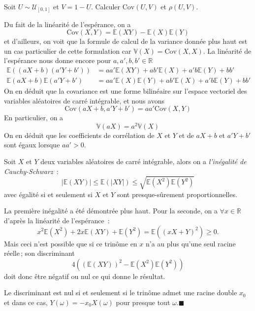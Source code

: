 \label{II-cov-unif}
Soit \(U \sim \mathcal{U}_{[0,1]}\) et \(V = 1-U\). Calculer
\(\text{Cov}(U,V)\) et \(\rho(U,V)\).

Du fait de la linéarité de l'espérance, on a
\[\text{Cov}(X,Y) = \mathbb{E}(XY) - \mathbb{E}(X)\mathbb{E}(Y)\] et
d'ailleurs, on voit que la formule de calcul de la variance donnée plus
haut est un cas particulier de cette formulation car
\(\mathbb{V}(X) = \text{Cov}(X,X)\). La linéarité de l'espérance nous
donne encore pour \(a,a',b,b' \in \mathbb{R}\) \begin{align*} 
\mathbb{E}((aX+b)(a'Y+b')) &= aa'\mathbb{E}(XY) + ab'\mathbb{E}(X) +a'b\mathbb{E}(Y) + bb'\\
\mathbb{E}(aX+b)\mathbb{E}(a'Y+b') &= aa'\mathbb{E}(X)\mathbb{E}(Y) + ab'\mathbb{E}(X) +a'b\mathbb{E}(Y) + bb'
\end{align*} On en déduit que la covariance est une forme bilinéaire sur
l'espace vectoriel des variables aléatoires de carré intégrable, et nous
avons \[\text{Cov}(aX+b,a'Y+b') = aa'\text{Cov}(X,Y)\] En particulier,
on a \[ \mathbb{V}(aX) = a^2\mathbb{V}(X)\] On en déduit que les
coefficients de corrélation de \(X\) et \(Y\) et de \(aX+b\) et
\(a'Y+b'\) sont égaux lorsque \(aa' >0\).

\begin{proposition}\label{II-CS}

Soit \(X\) et \(Y\) deux variables aléatoires de carré intégrable, alors
on a \emph{l'inégalité de Cauchy-Schwarz}~:
\[|\mathbb{E}(XY)| \leq \mathbb{E}(|XY|) \leq \sqrt{\mathbb{E}(X^2)\mathbb{E}(Y^2)}\]
avec égalité si et seulement si \(X\) et \(Y\) sont presque-sûrement
proportionnelles.
\end{proposition}

\begin{preuve}
La première inégalité a été démontrée plus haut. Pour la seconde, on a
\(\forall x \in \mathbb{R}\) d'après la linéarité de l'espérance~:
\[x^2\mathbb{E}(X^2) + 2x\mathbb{E}(XY)+ \mathbb{E}(Y^2) = \mathbb{E}((xX+Y)^2) \geq 0.\]
Mais ceci n'est possible que si ce trinôme en \(x\) n'a au plus qu'une
seul racine réelle\,; son discriminant
\[4\left((\mathbb{E}(XY))^2 - \mathbb{E}(X^2)\mathbb{E}(Y^2)\right)\]
doit donc être négatif ou nul ce qui donne le résultat.

Le discriminant est nul si et seulement si le trinôme admet une racine
double \(x_0\) et dans ce cas, \(Y(\omega) = -x_0 X(\omega)\) pour
presque tout \(\omega\).\hfill$\blacksquare$
\end{preuve}

